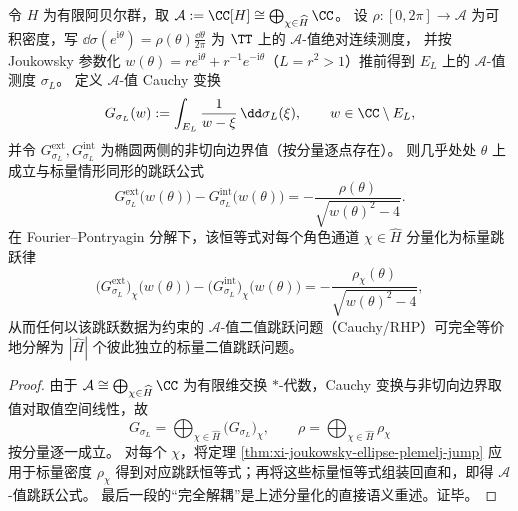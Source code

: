 \begin{theorem}\label{thm:xi-joukowsky-ellipse-jump-abelian-channel-decoupling}
令 \(H\) 为有限阿贝尔群，取 \(\mathcal{A}:=\CC[H]\cong\bigoplus_{\chi\in\widehat H}\CC\)。
设 \(\rho:[0,2\pi]\to\mathcal{A}\) 为可积密度，写 \(\dd\sigma(e^{\mathrm{i}\theta})=\rho(\theta)\frac{\dd\theta}{2\pi}\) 为 \(\TT\) 上的 \(\mathcal{A}\)-值绝对连续测度，
并按 Joukowsky 参数化 \(w(\theta)=r e^{\mathrm{i}\theta}+r^{-1}e^{-\mathrm{i}\theta}\)（\(L=r^2>1\)）推前得到 \(E_L\) 上的 \(\mathcal{A}\)-值测度 \(\sigma_L\)。
定义 \(\mathcal{A}\)-值 Cauchy 变换
\[
G_{\sigma_L}(w):=\int_{E_L}\frac{1}{w-\xi}\,\dd\sigma_L(\xi),\qquad w\in\CC\setminus E_L,
\]
并令 \(G^{\mathrm{ext}}_{\sigma_L},G^{\mathrm{int}}_{\sigma_L}\) 为椭圆两侧的非切向边界值（按分量逐点存在）。
则几乎处处 \(\theta\) 上成立与标量情形同形的跳跃公式
\[
\boxed{\;
G_{\sigma_L}^{\mathrm{ext}}\!\bigl(w(\theta)\bigr)-G_{\sigma_L}^{\mathrm{int}}\!\bigl(w(\theta)\bigr)
=-\frac{\rho(\theta)}{\sqrt{w(\theta)^2-4}}.\;}
\]
在 Fourier--Pontryagin 分解下，该恒等式对每个角色通道 \(\chi\in\widehat H\) 分量化为标量跳跃律
\[
\bigl(G_{\sigma_L}^{\mathrm{ext}}\bigr)_\chi\!\bigl(w(\theta)\bigr)-\bigl(G_{\sigma_L}^{\mathrm{int}}\bigr)_\chi\!\bigl(w(\theta)\bigr)
=-\frac{\rho_\chi(\theta)}{\sqrt{w(\theta)^2-4}},
\]
从而任何以该跳跃数据为约束的 \(\mathcal{A}\)-值二值跳跃问题（Cauchy/RHP）可完全等价地分解为 \(|\widehat H|\) 个彼此独立的标量二值跳跃问题。
\end{theorem}
\begin{proof}
由于 \(\mathcal{A}\cong\bigoplus_{\chi\in\widehat H}\CC\) 为有限维交换 \(\ast\)-代数，Cauchy 变换与非切向边界取值对取值空间线性，故
\[
G_{\sigma_L}=\bigoplus_{\chi\in\widehat H}\bigl(G_{\sigma_L}\bigr)_\chi,
\qquad
\rho=\bigoplus_{\chi\in\widehat H}\rho_\chi
\]
按分量逐一成立。
对每个 \(\chi\)，将定理 \ref{thm:xi-joukowsky-ellipse-plemelj-jump} 应用于标量密度 \(\rho_\chi\) 得到对应跳跃恒等式；再将这些标量恒等式组装回直和，即得 \(\mathcal{A}\)-值跳跃公式。
最后一段的“完全解耦”是上述分量化的直接语义重述。证毕。
\end{proof}

